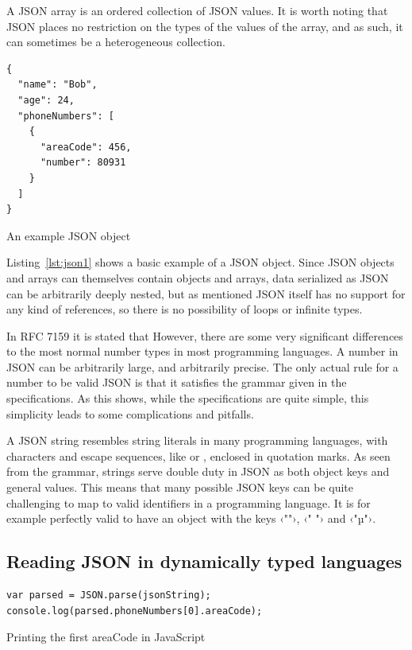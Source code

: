 A JSON array is an ordered collection of JSON values. It is worth noting that JSON places no restriction on the types of the values of the array, and as such, it can sometimes be a heterogeneous collection.

\begin{listing}[ht!]
\begin{verbatim}
{
  "name": "Bob",
  "age": 24,
  "phoneNumbers": [
    {
      "areaCode": 456,
      "number": 80931
    }
  ]
}
\end{verbatim}
\caption{An example JSON object}
\label{lst:json1}
\end{listing}

Listing~\ref{lst:json1} shows a basic example of a JSON object. Since JSON objects and arrays can themselves contain objects and arrays, data serialized as JSON can be arbitrarily deeply nested, but as mentioned JSON itself has no support for any kind of references, so there is no possibility of loops or infinite types.

In RFC 7159 it is stated that  However, there are some very significant differences to the most normal number types in most programming languages. A number in JSON can be arbitrarily large, and arbitrarily precise. The only actual rule for a number to be valid JSON is that it satisfies the grammar given in the specifications. As this shows, while the specifications are quite simple, this simplicity leads to some complications and pitfalls.

A JSON string resembles string literals in many programming languages, with characters and escape sequences, like  or , enclosed in quotation marks. As seen from the grammar, strings serve double duty in JSON as both object keys and general values. This means that many possible JSON keys can be quite challenging to map to valid identifiers in a programming language. It is for example perfectly valid to have an object with the keys ‹""›, ‹" "› and ‹"µ"›.


\subsection{Reading JSON in dynamically typed languages}

\begin{listing}[ht!]
\begin{verbatim}
var parsed = JSON.parse(jsonString);
console.log(parsed.phoneNumbers[0].areaCode);
\end{verbatim}
\caption{Printing the first areaCode in JavaScript}
\label{lst:readjsonjs}
\end{listing}

